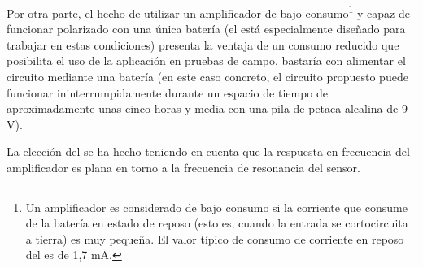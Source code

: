 Por otra parte, el hecho de utilizar un amplificador de bajo
consumo\footnote{Un amplificador es considerado de bajo consumo si la
corriente que consume de la batería en estado de reposo (esto es, cuando la
entrada se cortocircuita a tierra) es muy pequeña. El valor típico de
consumo de corriente en reposo del  es de 1,7 mA.} y capaz de
funcionar polarizado con una única batería (el  está
especialmente diseñado para trabajar en estas condiciones) presenta la
ventaja de un consumo reducido que posibilita el uso de la aplicación en
pruebas de campo, bastaría con alimentar el circuito mediante una batería
(en este caso concreto, el circuito propuesto puede funcionar
ininterrumpidamente durante un espacio de tiempo de aproximadamente unas
cinco horas y media con una pila de petaca alcalina de 9 V).

La elección del  se ha hecho teniendo en cuenta que la
respuesta en frecuencia del amplificador es plana en torno a la frecuencia
de resonancia del sensor.

%
%
%

